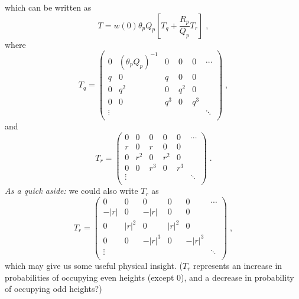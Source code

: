 \documentclass[a4paper,10pt]{article}
\begin{document}
which can be written as
\begin{equation}
  T  = w(0) \theta_p Q_p \left[ T_q + \frac{R_p}{Q_p} T_r \right] \;,
\end{equation}
where
\begin{equation}
  T_q = \begin{pmatrix}
         0      & (\theta_p Q_p)^{-1} & 0      & 0      & 0      & \cdots \\
         q      & 0                   & q      & 0      & 0      &        \\
         0      & q^2                 & 0      & q^2    & 0      &        \\
         0      & 0                   & q^3    & 0      & q^3    &        \\
         \vdots &                     &        &        &        & \ddots \\
        \end{pmatrix} \;,
\end{equation}
and
\begin{equation}
  T_r = \begin{pmatrix}
         0      & 0     & 0      & 0      & 0      & \cdots \\
         r      & 0     & r      & 0      & 0      &        \\
         0      & r^2   & 0      & r^2    & 0      &        \\
         0      & 0     & r^3    & 0      & r^3    &        \\
         \vdots &       &        &        &        & \ddots \\
        \end{pmatrix} \;.
\end{equation}
\emph{As a quick aside:} we could also write $T_r$ as
\begin{equation}
  T_r = \begin{pmatrix}
         0      & 0     & 0      & 0      & 0      & \cdots \\
         -|r|      & 0     & -|r|      & 0      & 0      &        \\
         0      & |r|^2   & 0      & |r|^2    & 0      &        \\
         0      & 0     & -|r|^3    & 0      & -|r|^3    &        \\
         \vdots &       &        &        &        & \ddots \\
        \end{pmatrix} \;,
\end{equation}
which may give us some useful physical insight. ($T_r$ represents an increase in probabilities of occupying even heights (except 0), and a decrease in probability of occupying odd heights?)
\end{document}
